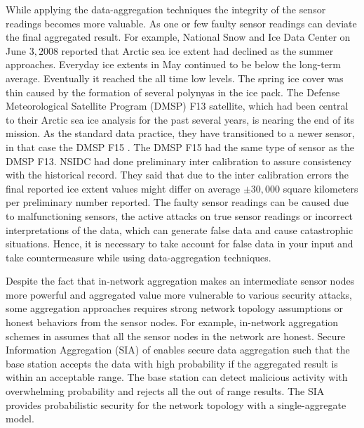 	While applying the data-aggregation techniques the integrity of the sensor readings becomes more valuable.
	As one or few faulty sensor readings can deviate the final aggregated result.
	For example,
	National Snow and Ice Data Center on June $3, 2008$ \cite{nsidc} reported that Arctic sea ice extent had declined as the summer approaches. 
	Everyday ice extents in May continued to be below the long-term average.
	Eventually it reached the all time low levels.
	The spring ice cover was thin caused by the formation of several polynyas in the ice pack.
	The Defense Meteorological Satellite Program (DMSP) F13 \cite{dmsp-f13} satellite, which had been central to their Arctic sea ice analysis for the past several years, is nearing the end of its mission.
	As the standard data practice, they have transitioned to a newer sensor, in that case the DMSP F15 \cite{dmsp-f15}. 
	The DMSP F15 had the same type of sensor as the DMSP F13. 
	NSIDC had done preliminary inter calibration to assure consistency with the historical record. 
	They said that due to the inter calibration errors the final reported ice extent values might differ on average $\pm 30,000$ square kilometers per preliminary number reported.
	The faulty sensor readings can be caused due to malfunctioning sensors, the active attacks on true sensor readings or incorrect interpretations of the data, which can generate false data and cause catastrophic situations.
	Hence, it is necessary to take account for false data in your input and take countermeasure while using data-aggregation techniques.

	Despite the fact that in-network aggregation makes an intermediate sensor nodes more powerful and aggregated value more vulnerable to various security attacks, some aggregation approaches requires strong network topology assumptions or honest behaviors from the sensor nodes.
	For example, in-network aggregation schemes in \cite{yao2002cougar, madden2003design} assumes that all the sensor nodes in the network are honest. 
	Secure Information Aggregation (SIA) of \cite{przydatek2003sia} enables secure data aggregation such that the base station accepts the data with high probability if the aggregated result is within an acceptable range.
	The base station can detect malicious activity with overwhelming probability and rejects all the out of range results.
	The SIA provides probabilistic security for the network topology with a single-aggregate model.

